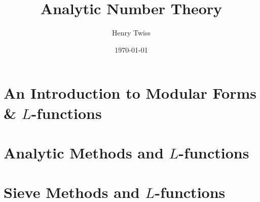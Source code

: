 \documentclass[12pt,oneside]{book}
\title{Analytic Number Theory}
\author{Henry Twiss}
\date{\today}
\begin{document}
\maketitle
\pagestyle{empty}
\tableofcontents
\setcounter{page}{0}

\part{An Introduction to Modular Forms \& \texorpdfstring{$L$}{L}-functions}
  \pagestyle{fancy}
  
  
  
  

\part{Analytic Methods and \texorpdfstring{$L$}{L}-functions}
  
  
  
  
  

\part{Sieve Methods and \texorpdfstring{$L$}{L}-functions}
  
  



\printindex


\end{document}
